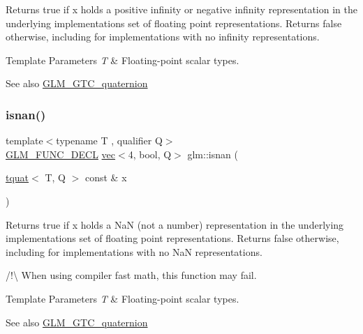 Returns true if x holds a positive infinity or negative infinity representation in the underlying implementation\textquotesingle{}s set of floating point representations. Returns false otherwise, including for implementations with no infinity representations.


\begin{DoxyTemplParams}{Template Parameters}
{\em T} & Floating-\/point scalar types.\\
\hline
\end{DoxyTemplParams}
\begin{DoxySeeAlso}{See also}
\hyperlink{group__gtc__quaternion}{G\+L\+M\+\_\+\+G\+T\+C\+\_\+quaternion} 
\end{DoxySeeAlso}
\mbox{\label{group__gtc__quaternion_ga31f4378ab97985177e208f4f4f8b1fd3}} 
\subsubsection{\texorpdfstring{isnan()}{isnan()}}
{\footnotesize\ttfamily template$<$typename T , qualifier Q$>$ \\
\hyperlink{setup_8hpp_ab2d052de21a70539923e9bcbf6e83a51}{G\+L\+M\+\_\+\+F\+U\+N\+C\+\_\+\+D\+E\+CL} \hyperlink{structglm_1_1vec}{vec}$<$4, bool, Q$>$ glm\+::isnan (\begin{DoxyParamCaption}\item[{\hyperlink{structglm_1_1tquat}{tquat}$<$ T, Q $>$ const \&}]{x }\end{DoxyParamCaption})}

Returns true if x holds a NaN (not a number) representation in the underlying implementation\textquotesingle{}s set of floating point representations. Returns false otherwise, including for implementations with no NaN representations.

/!\textbackslash{} When using compiler fast math, this function may fail.


\begin{DoxyTemplParams}{Template Parameters}
{\em T} & Floating-\/point scalar types.\\
\hline
\end{DoxyTemplParams}
\begin{DoxySeeAlso}{See also}
\hyperlink{group__gtc__quaternion}{G\+L\+M\+\_\+\+G\+T\+C\+\_\+quaternion} 
\end{DoxySeeAlso}
\mbox{\label{group__gtc__quaternion_gab33f82f8d1c9223d335aab752a126855}} 

